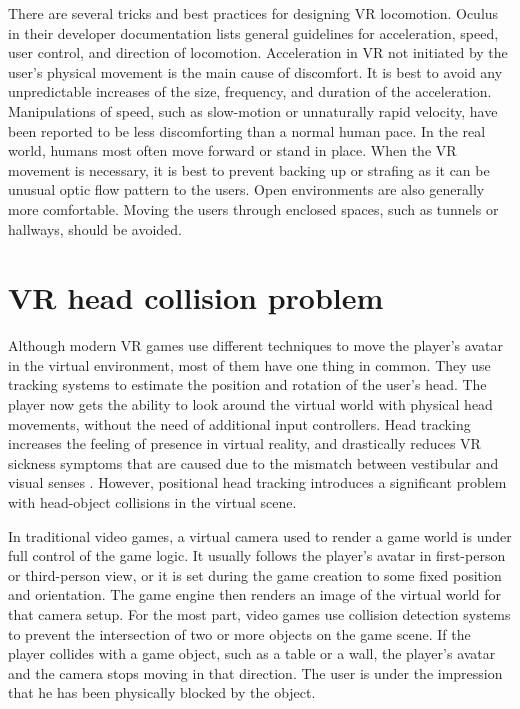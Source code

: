There are several tricks and best practices for designing VR locomotion. Oculus in their developer documentation \cite{OCULUSDOC} lists general guidelines for acceleration, speed, user control, and direction of locomotion. Acceleration in VR not initiated by the user's physical movement is the main cause of discomfort. It is best to avoid any unpredictable increases of the size, frequency, and duration of the acceleration. Manipulations of speed, such as slow-motion or unnaturally rapid velocity, have been reported to be less discomforting than a normal human pace. In the real world, humans most often move forward or stand in place. When the VR movement is necessary, it is best to prevent backing up or strafing as it can be unusual optic flow pattern to the users. Open environments are also generally more comfortable. Moving the users through enclosed spaces, such as tunnels or hallways, should be avoided.

\section{VR head collision problem}

Although modern VR games use different techniques to move the player's avatar in the virtual environment, most of them have one thing in common. They use tracking systems to estimate the position and rotation of the user's head. The player now gets the ability to look around the virtual world with physical head movements, without the need of additional input controllers. Head tracking increases the feeling of presence in virtual reality, and drastically reduces VR sickness symptoms that are caused due to the mismatch between vestibular and visual senses \cite{HEADTRACKINGSYMPTOMS}. However, positional head tracking introduces a significant problem with head-object collisions in the virtual scene.

In traditional video games, a virtual camera used to render a game world is under full control of the game logic. It usually follows the player's avatar in first-person or third-person view, or it is set during the game creation to some fixed position and orientation. The game engine then renders an image of the virtual world for that camera setup. For the most part, video games use collision detection systems to prevent the intersection of two or more objects on the game scene. If the player collides with a game object, such as a table or a wall, the player's avatar and the camera stops moving in that direction. The user is under the impression that he has been physically blocked by the object. 


